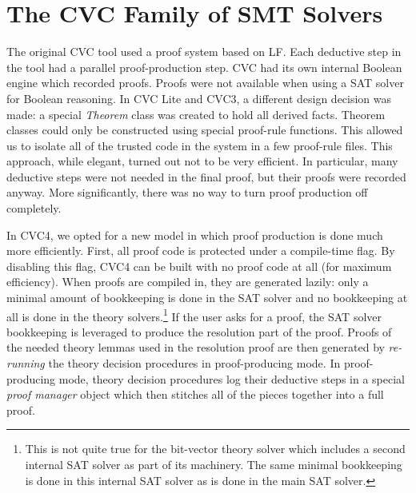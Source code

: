 \documentclass{llncs}
\begin{document}


\section{The CVC Family of SMT Solvers}
\label{sec:cvc}

The original CVC tool used a proof system based on LF.  Each deductive step in
the tool had a parallel proof-production step.  CVC had its own internal
Boolean engine which recorded proofs.  Proofs were not available when using a
SAT solver for Boolean reasoning.  In CVC Lite and CVC3, a different design
decision was made: a special \emph{Theorem} class was created to hold all
derived facts.  Theorem classes could only be constructed using special
proof-rule functions.  This allowed us to isolate all of the trusted code in
the system in a few proof-rule files.  This approach, while elegant, turned out
not to be very efficient.  In particular, many deductive steps were not needed
in the final proof, but their proofs were recorded anyway.  More significantly,
there was no way to turn proof production off completely.

In CVC4, we opted for a new model in which proof production is done much more efficiently.
First, all proof code is protected under a compile-time flag.  By
disabling this flag, CVC4 can be built with no proof code at all (for maximum
efficiency).  When proofs are compiled in, they are generated lazily: only a
minimal amount of bookkeeping is done in the SAT solver and no bookkeeping at
all is done in the theory solvers.\footnote{This is not quite true for the
  bit-vector theory solver which includes a second internal SAT solver as part
  of its machinery.  The same minimal bookkeeping is done in this internal SAT
  solver as is done in the main SAT solver.}  If the user asks for a proof, the SAT solver
bookkeeping is leveraged to produce the resolution part of the proof.  Proofs of the
needed theory lemmas used in the resolution proof are then 
generated by \emph{re-running} the theory decision procedures in
proof-producing mode.  In proof-producing mode, theory decision procedures log their
deductive steps in a special \emph{proof manager} object which then stitches
all of the pieces together into a full proof.
\end{document}
